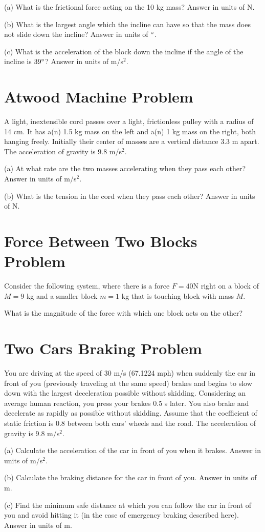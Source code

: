 \documentclass[../physics12.tex]{subfiles}
\begin{document}
(a) What is the frictional force acting on the 10 kg mass?
Answer in units of N.

(b) What is the largest angle which the incline can have so that the mass does not slide down the incline?
Answer in units of $\degree$.

(c) What is the acceleration of the block down the incline if the angle of the incline is $39\degree$?
Answer in units of m/s$^2$.

\section{Atwood Machine Problem}
A light, inextensible cord passes over a light, frictionless pulley with a radius of 14 cm. It has a(n) 1.5 kg mass on the left and a(n) 1 kg mass on the right, both hanging freely.
Initially their center of masses are a vertical distance 3.3 m apart.
The acceleration of gravity is 9.8 m/s$^2$.

(a) At what rate are the two masses accelerating when they pass each other?
Answer in units of m/s$^2$.

(b) What is the tension in the cord when they pass each other?
Answer in units of N.

\section{Force Between Two Blocks Problem}
Consider the following system, where there is a force $F = 40$N right on a block of $M = 9$ kg and a smaller block $m=1$ kg that is touching block with mass $M$.

What is the magnitude of the force with which one block acts on the other?

\section{Two Cars Braking Problem}
You are driving at the speed of 30 m/s (67.1224 mph) when suddenly the car in front of you (previously traveling at the same speed) brakes and begins to slow down with the largest 
deceleration possible without skidding. Considering an average human reaction, you press your brakes 0.5 s later.
You also brake and decelerate as rapidly as possible without skidding. Assume that the coefficient of static friction is 0.8 between both cars' wheels and the road.
The acceleration of gravity is 9.8 m/s$^2$.

(a) Calculate the acceleration of the car in front of you when it brakes.
Answer in units of m/s$^2$.

(b) Calculate the braking distance for the car in front of you.
Answer in units of m.

(c) Find the minimum safe distance at which you can follow the car in front of you and avoid hitting it (in the case of emergency braking described here).
Answer in units of m.
\end{document}
